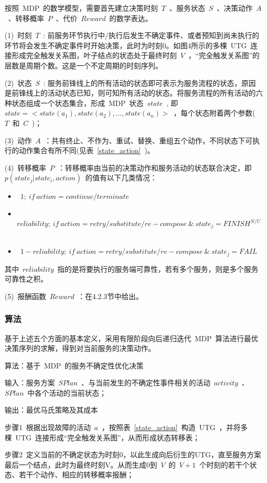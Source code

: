 按照~MDP~的数学模型，需要首先建立决策时刻~$T$~、服务状态~$S$~、决策动作~$A$~、转移概率~$P$~、代价~$Reward$~的数学表达。

(1)~时刻~$T$~: 前服务环节执行中/执行后发生不确定事件、或者预知到尚未执行的环节将会发生不确定事件时开始决策，此时为时刻0。如图4所示的多棵~UTG~连接形成完全触发关系图，叶子结点的状态处于最终时刻~$V$~，“完全触发关系图”的层数是周期个数。这是一个不定周期的时刻序列。

(2)~状态~$S$~: 服务前锋线上的所有活动的状态即可表示为服务流程的状态，原因是前锋线上的活动状态已知，则可知所有活动的状态。将服务流程的所有活动的六种状态组成一个状态集合，形成~MDP~状态~$state$~, 即~$state =  < state({a_1}),state({a_2}), \ldots ,state({a_n}) >$~，每个状态附着两个参数(~$T$~和~$C$~)；

(3)~动作~$A$~：共有终止、不作为、重试、替换、重组五个动作，不同状态下可执行的动作集合有所不同(见表~\ref{state_action}~)。

(4)~转移概率~$P$~：转移概率由当前的决策动作和服务活动的状态联合决定，即~$p(state_j|state_i,action)$~的值有以下几类情况：
\begin{itemize}
\item ~$1;~if~action = continue/terminate$~
\item ~$reliability;~if~action = retry/substitute/re-compose~ \& ~ state_j = FINIS{H^{N/U}}$~
\item ~$1 - reliability;~if~action = retry/substitute/re-compose ~\& ~ state_j = FAIL$~
\end{itemize}
其中~$reliability$~指的是将要执行的服务端可靠性，若有多个服务，则是多个服务可靠性之积。

(5)~报酬函数~$Reward$~：在4.2.3节中给出。

\subsubsection{算法}

基于上述五个方面的基本定义，采用有限阶段向后递归迭代~MDP~算法进行最优决策序列的求解，得到对当前服务的决策动作。

算法：基于~MDP~的服务不确定性优化决策

输入：服务方案~$SPlan$~、与当前发生的不确定性事件相关的活动~$activity$~、
~$SPlan$~中各个活动的当前状态；

输出：最优马氏策略及其成本

步骤1~根据出现故障的活动~$a$~，按照表~\ref{state_action}~构造~UTG~，并将多棵~UTG~连接形成“完全触发关系图”，从而形成状态转移表；

步骤2~定义当前的不确定状态为时刻0，以此生成向后衍生的UTG，直至服务方案最后一个结点，此时为最终时刻V。从而生成0到~$V$~的~$V+1$~个时刻的若干个状态、若干个动作、相应的转移概率报酬；

